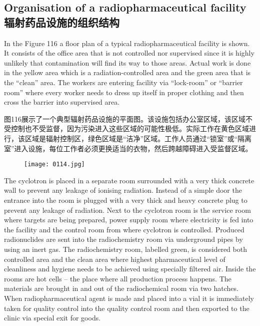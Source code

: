 \documentclass[dvipsnames, svgnames,a4paper,11pt]{article}
\begin{document}
\subsection{Organisation of a radiopharmaceutical facility \\辐射药品设施的组织结构}


In the Figure 116 a floor plan of a typical radiopharmaceutical facility is shown. It
consists of the office area that is not controlled nor supervised since it is highly
unlikely that contamination will find its way to those areas. Actual work is done in the
yellow area which is a radiation-controlled area and the green area that is the “clean”
area. The workers are entering facility via “lock-room” or “barrier room” where every
worker needs to dress up itself in proper clothing and then cross the barrier into
supervised area.

图116展示了一个典型辐射药品设施的平面图。该设施包括办公室区域，该区域不受控制也不受监督，因为污染进入这些区域的可能性极低。实际工作在黄色区域进行，该区域是辐射控制区，绿色区域是“洁净”区域。工作人员通过“锁室”或“隔离室”进入设施，每位工作者必须更换适当的衣物，然后跨越障碍进入受监督区域。

\begin{figure}[h]
    \centering
    \texttt{[image: 0114.jpg]}
     \label{fig116}
\end{figure}

The cyclotron is placed in a separate room surrounded with a very thick concrete
wall to prevent any leakage of ionising radiation. Instead of a simple door the
entrance into the room is plugged with a very thick and heavy concrete plug to
prevent any leakage of radiation. Next to the cyclotron room is the service room
where targets are being prepared, power supply room where electricity is fed into the
facility and the control room from where cyclotron is controlled. Produced
radionuclides are sent into the radiochemistry room via underground pipes by using
an inert gas. The radiochemistry room, labelled green, is considered both controlled
area and the clean area where highest pharmaceutical level of cleanliness and
hygiene needs to be achieved using specially filtered air. Inside the rooms are hot
cells – the place where all production process happens. The materials are brought in
and out of the radiochemical room via two hatches. When radiopharmaceutical agent
is made and placed into a vial it is immediately taken for quality control into the
quality control room and then exported to the clinic via special exit for goods.
\end{document}
